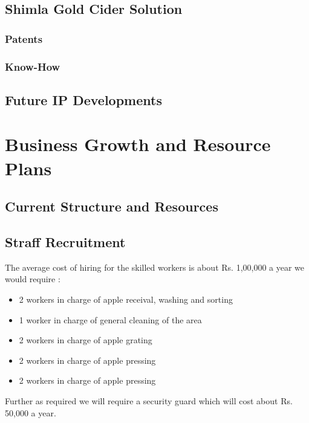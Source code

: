 \documentclass[11pt]{article}
\begin{document}
  \subsection{Shimla Gold Cider Solution}
    \subsubsection{Patents}
    \subsubsection{Know-How}
  \subsection{Future IP Developments}
\section{Business Growth and Resource Plans}
  \subsection{Current Structure and Resources}
  \subsection{Straff Recruitment}

The average cost of hiring for the skilled workers is about Rs. 1,00,000 a year we would require :
\begin{itemize}

\item 2 workers in charge of apple receival, washing and sorting  
\item 1 worker in charge of general cleaning of the area
\item 2 workers in charge of apple grating
\item 2 workers in charge of apple pressing
\item 2 workers in charge of apple pressing 

\end{itemize}

Further as required we will require a security guard which will cost about Rs. 50,000 a year.
 
\end{document}
